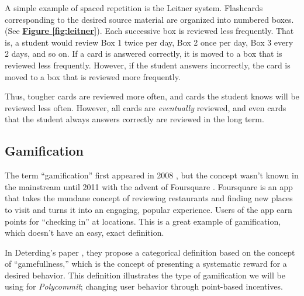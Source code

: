\par A simple example of spaced repetition is the Leitner system. Flashcards corresponding to the desired source material are organized into numbered boxes. (See \textbf{\hyperref[fig:leitner]{Figure \ref*{fig:leitner}}}). Each successive box is reviewed less frequently. That is, a student would review Box 1 twice per day, Box 2 once per day, Box 3 every 2 days, and so on. If a card is answered correctly, it is moved to a box that is reviewed less frequently. However, if the student answers incorrectly, the card is moved to a box that is reviewed more frequently.

\par Thus, tougher cards are reviewed more often, and cards the student knows will be reviewed less often. However, all cards are \textit{eventually} reviewed, and even cards that the student always answers correctly are reviewed in the long term.

\subsection{Gamification}
\par The term ``gamification'' first appeared in 2008 , but the concept wasn't known in the mainstream until 2011 with the advent of Foursquare \cite{Deterding:2011:GDE:2181037.2181040}. Foursquare is an app that takes the mundane concept of reviewing restaurants and finding new places to visit and turns it into an engaging, popular experience. Users of the app earn points for ``checking in'' at locations. This is a great example of gamification, which doesn't have an easy, exact definition. 

\par In Deterding's paper \cite{Deterding:2011:GDE:2181037.2181040}, they propose a categorical definition based on the concept of ``gamefullness,'' which is the concept of presenting a systematic reward for a desired behavior. This definition illustrates the type of gamification we will be using for \textit{Polycommit}; changing user behavior through point-based incentives.



